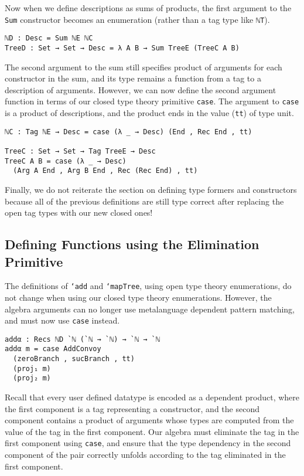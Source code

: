 \documentclass[runningheads,a4paper]{llncs}
\begin{document}
Now when we define descriptions as sums of products, the first
argument to the {\tt Sum} constructor becomes an enumeration (rather
than a tag type like {\tt ℕT}).

\begin{verbatim}
ℕD : Desc = Sum ℕE ℕC
TreeD : Set → Set → Desc = λ A B → Sum TreeE (TreeC A B)
\end{verbatim}

The second argument to the sum still specifies product of arguments
for each constructor in the sum, and its type remains a function from
a tag to a description of arguments.
However, we can now define the second argument function in terms of
our closed type theory primitive {\tt case}. The argument to
{\tt case} is a product of descriptions, and the product ends in the
value ({\tt tt}) of type unit.

\begin{verbatim}
ℕC : Tag ℕE → Desc = case (λ _ → Desc) (End , Rec End , tt)

TreeC : Set → Set → Tag TreeE → Desc
TreeC A B = case (λ _ → Desc)
  (Arg A End , Arg B End , Rec (Rec End) , tt)
\end{verbatim}

Finally, we do not reiterate the section on defining type formers and
constructors because all of the previous definitions are still type
correct after replacing the open tag types with our new closed ones!

\subsection{Defining Functions using the Elimination Primitive}

The definitions of {\tt `add} and {\tt `mapTree}, using open type
theory enumerations, do not change when using our closed type theory
enumerations. However, the algebra arguments can no longer use
metalanguage dependent pattern matching, and must now use
{\tt case} instead.

\begin{verbatim}
addα : Recs ℕD `ℕ (`ℕ → `ℕ) → `ℕ → `ℕ
addα m = case AddConvoy
  (zeroBranch , sucBranch , tt)
  (proj₁ m)
  (proj₂ m)
\end{verbatim}

Recall that every user defined datatype is encoded as a dependent
product, where the first component is a tag representing a constructor,
and the second component contains a product of arguments whose types
are computed from the value of the tag in the first component.
Our algebra must
eliminate the tag in the first component using {\tt case}, and ensure that the type dependency
in the second component of the pair correctly unfolds according to the
tag eliminated in the first component. 
\end{document}
